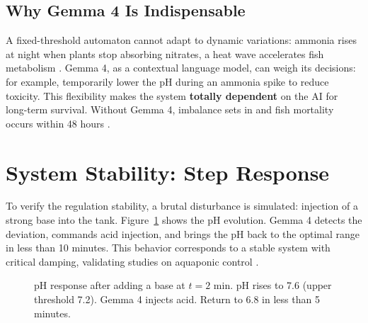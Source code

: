 \documentclass[12pt,a4paper]{article}
\begin{document}
\subsection{Why Gemma 4 Is Indispensable}

A fixed-threshold automaton cannot adapt to dynamic variations: ammonia rises at night when plants stop absorbing nitrates, a heat wave accelerates fish metabolism \cite{tolerance2020}. Gemma 4, as a contextual language model, can weigh its decisions: for example, temporarily lower the pH during an ammonia spike to reduce toxicity. This flexibility makes the system \textbf{totally dependent} on the AI for long-term survival. Without Gemma 4, imbalance sets in and fish mortality occurs within 48 hours \cite{waterquality2020}.

\section{System Stability: Step Response}

To verify the regulation stability, a brutal disturbance is simulated: injection of a strong base into the tank. Figure~\ref{fig:step_response} shows the pH evolution. Gemma 4 detects the deviation, commands acid injection, and brings the pH back to the optimal range in less than 10 minutes. This behavior corresponds to a stable system with critical damping, validating studies on aquaponic control \cite{control2020}.

\begin{figure}[H]
\centering
{}
\caption{pH response after adding a base at $t=2$ min. pH rises to 7.6 (upper threshold 7.2). Gemma 4 injects acid. Return to 6.8 in less than 5 minutes.}
\label{fig:step_response}
\end{figure}
\end{document}
